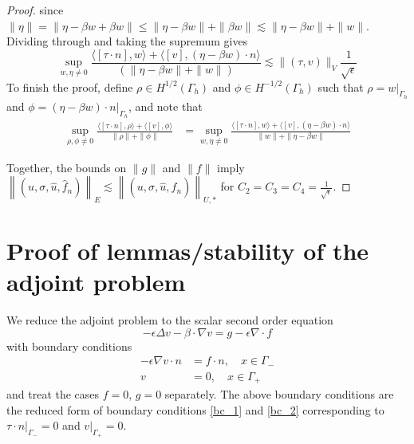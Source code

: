 \documentclass[11pt,onecolumn]{scrartcl}
\newcommand{\grad}{\nabla}
\renewcommand{\div}{\grad \cdot}
\begin{document}
\begin{proof}
since $\|\eta\| = \|\eta - \beta w + \beta w\| \leq \|\eta - \beta w\| + \|\beta w\| \lesssim \|\eta-\beta w\| + \|w\|$.  Dividing through and taking the supremum gives
\[
\sup_{w,\eta \neq 0} \frac{\langle[\tau\cdot n],w\rangle + \langle [v],\left(\eta - \beta w\right)\cdot n\rangle}{\left(\|\eta-\beta w\| + \|w\|\right)} \lesssim \|\left(\tau,v\right)\|_V\frac{1}{\sqrt{\epsilon}}
\]
To finish the proof, define $\rho \in H^{1/2}(\Gamma_h)$ and $\phi \in H^{-1/2}(\Gamma_h)$ such that $\rho = \left.w\right|_{\Gamma_h}$ and $\phi = \left.(\eta-\beta w)\cdot n\right|_{\Gamma_h}$, and note that
\begin{align*}
\sup_{\rho,\phi \neq 0} \frac{\langle [\tau\cdot n],\rho\rangle + \langle [v],\phi \rangle}{\|\rho\|+\|\phi\|} &= \sup_{w,\eta \neq 0} \frac{\langle [\tau\cdot n],w\rangle + \langle [v],\left(\eta - \beta w\right)\cdot n\rangle}{ \|w\|+\|\eta-\beta w\|} 
\end{align*}

Together, the bounds on $\|g\|$ and $\|f\|$ imply $\left\|\left(u,\sigma,\widehat{u},\widehat{f}_n\right)\right\|_{E} \lesssim \left\|\left(u,\sigma,\widehat{u},\widehat{f}_n\right)\right\|_{U,*}$ for $C_2 = C_3 = C_4 = \frac{1}{\sqrt{\epsilon}}$.  
\end{proof}


\section{Proof of lemmas/stability of the adjoint problem}

We reduce the adjoint problem to the scalar second order equation
\begin{equation}
- \epsilon \Delta v - \beta \cdot \grad v = g - \epsilon \div f \label{adjoint}
\end{equation}
with boundary conditions
\begin{align}
- \epsilon \grad v \cdot n &=f\cdot n, \quad x\in \Gamma_- \label{reducedbc_1}\\ 
v &= 0, \quad x\in \Gamma_+ \label{reducedbc_2}
\end{align}
and treat the cases $f=0$, $g=0$ separately.  The above boundary conditions are the reduced form of boundary conditions \eqref{bc_1} and \eqref{bc_2} corresponding to $\left.\tau\cdot n\right|_{\Gamma_-}=0$ and $\left.v\right|_{\Gamma_+}=0$. 
\end{document}
